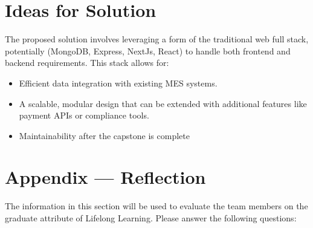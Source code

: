 \documentclass[12pt]{article}
\begin{document}
\section{Ideas for Solution}
The proposed solution involves leveraging a form of the traditional web full stack, potentially (MongoDB, Express, NextJs, React) to handle both frontend and backend requirements. This stack allows for:
\begin{itemize}
    \item Efficient data integration with existing MES systems.
    \item A scalable, modular design that can be extended with additional features like payment APIs or compliance tools.
    \item Maintainability after the capstone is complete
\end{itemize}
 


\newpage{}
\section*{Appendix --- Reflection}

The information in this section will be used to evaluate the team members on the
graduate attribute of Lifelong Learning.  Please answer the following questions:
\end{document}
